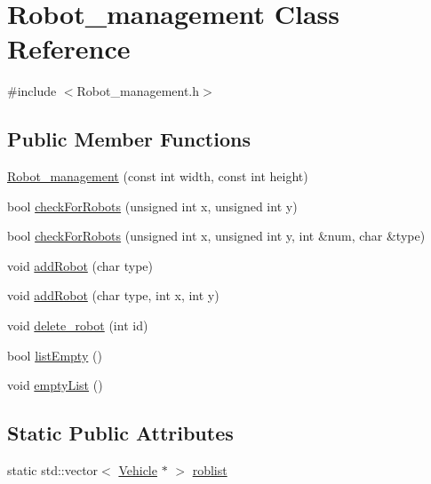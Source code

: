 \hypertarget{class_robot__management}{\section{Robot\-\_\-management Class Reference}
\label{class_robot__management}
}


{\ttfamily \#include $<$Robot\-\_\-management.\-h$>$}

\subsection*{Public Member Functions}
\begin{DoxyCompactItemize}
\item 
\hyperlink{class_robot__management_a7c70a0df4a26ead685202d372c756079}{Robot\-\_\-management} (const int width, const int height)
\item 
bool \hyperlink{class_robot__management_a9f55e341be1e0c8d5a532b63a31b5115}{check\-For\-Robots} (unsigned int x, unsigned int y)
\item 
bool \hyperlink{class_robot__management_afcf39f34f19143b28efa81af072a6159}{check\-For\-Robots} (unsigned int x, unsigned int y, int \&num, char \&type)
\item 
void \hyperlink{class_robot__management_a783299145c4194e2b005ec66b34026ee}{add\-Robot} (char type)
\item 
void \hyperlink{class_robot__management_afbd5514d1ae7869c50b41ed62ebedd42}{add\-Robot} (char type, int x, int y)
\item 
void \hyperlink{class_robot__management_aeda3aa818ca41a1825f40325aea1ca3c}{delete\-\_\-robot} (int id)
\item 
bool \hyperlink{class_robot__management_a6d7fc2f2442081b9cbf7ab62a60d5426}{list\-Empty} ()
\item 
void \hyperlink{class_robot__management_ac1a9ddc1089b1f4a26e7a7effef79142}{empty\-List} ()
\end{DoxyCompactItemize}
\subsection*{Static Public Attributes}
\begin{DoxyCompactItemize}
\item 
static std\-::vector$<$ \hyperlink{class_vehicle}{Vehicle} $\ast$ $>$ \hyperlink{class_robot__management_ac309bb3cf06c0a84b058bc1f0459de39}{roblist}
\end{DoxyCompactItemize}


